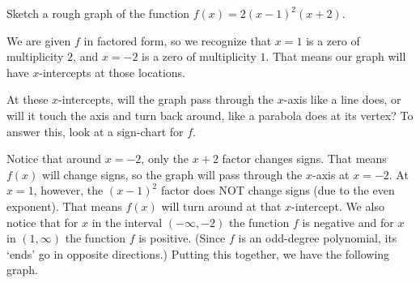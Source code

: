 \documentclass{ximera}
\begin{document}
\begin{example}
	Sketch a rough graph of the function $f(x) = 2(x-1)^2(x+2)$.

	\begin{explanation}
		We are given $f$ in factored form, so we recognize that $x=1$ is a zero of multiplicity $2$, and $x=-2$ is a zero of multiplicity $1$.
		That means our graph will have $x$-intercepts at those locations.
		
		At these $x$-intercepts, will the graph pass through the $x$-axis like a line does, or will it touch the axis and turn back
		around, like a parabola does at its vertex?  To answer this, look at a sign-chart for $f$.

		\begin{center}
		\end{center}
		
		Notice that around $x=-2$, only the $x+2$ factor changes signs.  That means $f(x)$ will change signs, so the graph will pass through the $x$-axis at $x=-2$.
		At $x=1$, however, the $(x-1)^2$ factor does NOT change signs (due to the even exponent).  That means $f(x)$ will turn around at that $x$-intercept.  
		We also notice that for $x$ in the interval $(-\infty, -2)$ the function $f$ is negative and for $x$ in $(1,\infty)$ the function $f$ is positive.
		(Since $f$ is an odd-degree polynomial, its `ends' go in opposite directions.) Putting this together, we have the following graph.
		
		\begin{center}
		\end{center}
	\end{explanation}
\end{example}
\end{document}
